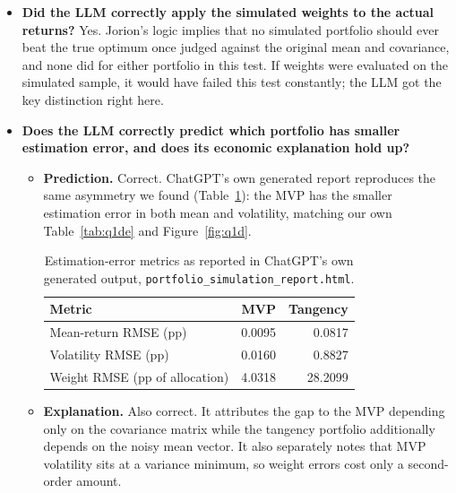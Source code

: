 \documentclass[11pt]{article}
\begin{document}
\begin{itemize}
A small data analysis difference: it re-factorizes the covariance matrix on
every draw rather than reusing a single Cholesky factor, which is correct but
slower.

\item \textbf{Did the LLM correctly apply the simulated weights to the actual
returns?} Yes. Jorion's logic implies that no simulated portfolio should ever
beat the true optimum once judged against the original mean and covariance,
and none did for either portfolio in this test. If weights were evaluated on
the simulated sample, it would have failed this test constantly; the LLM got
the key distinction right here.

\item \textbf{Does the LLM correctly predict which portfolio has smaller
estimation error, and does its economic explanation hold up?}
\begin{itemize}
\item \textbf{Prediction.} Correct. ChatGPT's own generated report reproduces
the same asymmetry we found (Table~\ref{tab:llm_output}): the MVP has the
smaller estimation error in both mean and volatility, matching our own
Table~\ref{tab:q1de} and Figure~\ref{fig:q1d}.

\begin{table}[H]
\centering
\caption{Estimation-error metrics as reported in ChatGPT's own generated
output, \texttt{portfolio\_simulation\_report.html}.}
\small
\begin{tabular}{lrr}
\toprule
Metric & MVP & Tangency \\
\midrule
Mean-return RMSE (pp) & 0.0095 & 0.0817 \\
Volatility RMSE (pp) & 0.0160 & 0.8827 \\
Weight RMSE (pp of allocation) & 4.0318 & 28.2099 \\
\bottomrule
\end{tabular}
\label{tab:llm_output}
\end{table}

\item \textbf{Explanation.} Also correct. It attributes the gap to the MVP
depending only on the covariance matrix while the tangency portfolio
additionally depends on the noisy mean vector. It also separately notes that
MVP volatility sits at a variance minimum, so weight errors cost only a
second-order amount.
\end{itemize}

\end{itemize}
\end{document}
